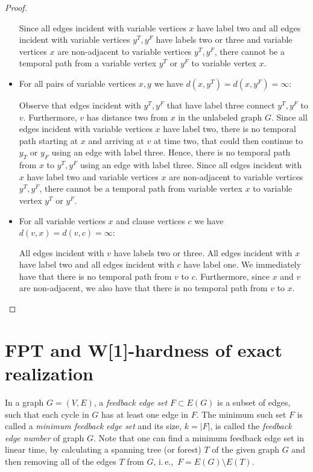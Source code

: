 \documentclass[11pt,a4paper]{article}
\theoremstyle{remark}
\theoremstyle{definition}
\newcommand{\ie}{i.\,e.,\ }
\begin{document}
\begin{proof}
\begin{itemize}
Since all edges incident with variable vertices $x$ have label two and all edges incident with variable vertices $y^T, y^F$ have labels two or three and variable vertices $x$ are non-adjacent to variable vertices $y^T,y^F$, there cannot be a temporal path from a variable vertex $y^T$ or $y^F$ to variable vertex $x$.
\item For all pairs of variable vertices $x,y$ we have $d(x,y^T)=d(x,y^F)=\infty$:

Observe that edges incident with $y^T, y^F$ that have label three connect $y^T, y^F$ to $v$. Furthermore, $v$ has distance two from $x$ in the unlabeled graph $G$. Since all edges incident with variable vertices $x$ have label two, there is no temporal path starting at $x$ and arriving at $v$ at time two, that could then continue to $y_T$ or $y_F$ using an edge with label three. Hence, there is no temporal path from $x$ to $y^T, y^F$ using an edge with label three. Since all edges incident with $x$ have label two and variable vertices $x$ are non-adjacent to variable vertices $y^T,y^F$, there cannot be a temporal path from variable vertex $x$ to variable vertex $y^T$ or $y^F$.
\item For all variable vertices $x$ and clause vertices $c$ we have $d(v,x)=d(v,c)=\infty$:

All edges incident with $v$ have labels two or three. All edges incident with $x$ have label two and all edges incident with $c$ have label one. We immediately have that there is no temporal path from $v$ to $c$. Furthermore, since $x$ and $v$ are non-adjacent, we also have that there is no temporal path from $v$ to $x$.
\end{itemize}
\end{proof}

\section{FPT and W[1]-hardness of exact realization}
In a graph $G=(V,E)$, a \emph{feedback edge set} $F \subset E(G)$ is a subset of edges, such that each cycle in $G$ has at least one edge in $F$.
The minimum such set $F$ is called a  \emph{minimum feedback edge set} and its size, $k = |F|$, is called the \emph{feedback edge number} of graph $G$.
Note that one can find a minimum feedback edge set in linear time, by calculating a spanning tree (or forest) $T$ of the given graph $G$ and then removing all of the edges $T$ from $G$, \ie $F = E(G) \setminus E(T)$.
\end{document}
